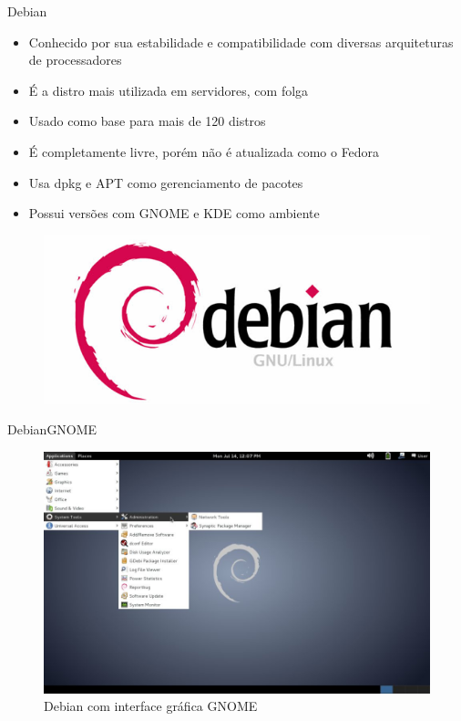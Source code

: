 \documentclass{beamer}
\begin{document}
\begin{frame}{Debian}
    \begin{itemize}
        \item{Conhecido por sua estabilidade e compatibilidade com diversas arquiteturas de processadores} 
        \item{É a distro mais utilizada em servidores, com folga}
        \item{Usado como base para mais de 120 distros}
        \item{É completamente livre, porém não é atualizada como o Fedora}
        \item{Usa dpkg e APT como gerenciamento de pacotes}
        \item{Possui versões com GNOME e KDE como ambiente}
    \end{itemize}
    \begin{figure}[h!]
        \centering
        \includegraphics[scale=0.20]{debian.png}
    \end{figure}
\end{frame}

\begin{frame}{Debian}{GNOME}
 \begin{figure}[h!]
        \centering
        \includegraphics[scale=0.27]{debianGNOME.jpg}
        \caption{Debian com interface gráfica GNOME}
        \label{fig:Comando ls}
    \end{figure}
\end{frame}
\end{document}
